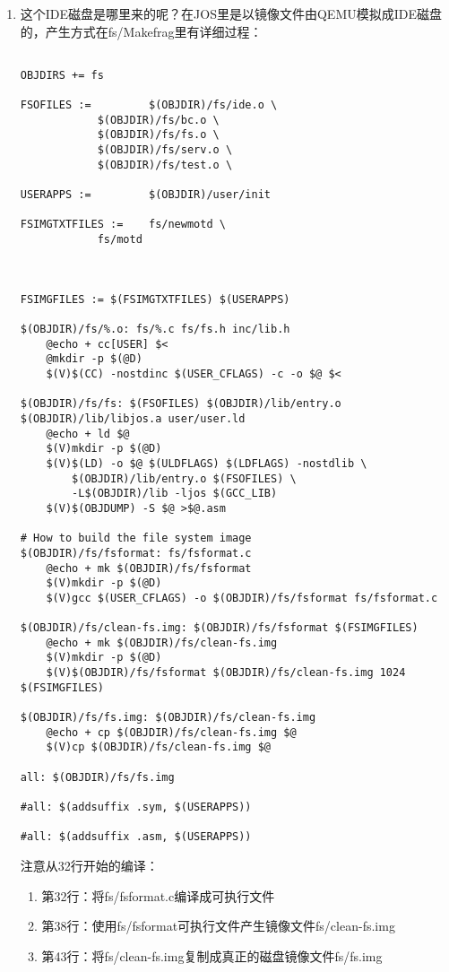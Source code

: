 \documentclass{article}
\begin{document}
\begin{CJK*}{UTF8}{gkai}
\begin{enumerate}
\item{这个IDE磁盘是哪里来的呢？在JOS里是以镜像文件由QEMU模拟成IDE磁盘的，产生方式在fs/Makefrag里有详细过程：

\begin{lstlisting}[style=mcode, title={\scriptsize \ttfamily \bfseries fs/Makefrag}]

OBJDIRS += fs

FSOFILES := 		$(OBJDIR)/fs/ide.o \
			$(OBJDIR)/fs/bc.o \
			$(OBJDIR)/fs/fs.o \
			$(OBJDIR)/fs/serv.o \
			$(OBJDIR)/fs/test.o \

USERAPPS := 		$(OBJDIR)/user/init

FSIMGTXTFILES :=	fs/newmotd \
			fs/motd



FSIMGFILES := $(FSIMGTXTFILES) $(USERAPPS)

$(OBJDIR)/fs/%.o: fs/%.c fs/fs.h inc/lib.h
	@echo + cc[USER] $<
	@mkdir -p $(@D)
	$(V)$(CC) -nostdinc $(USER_CFLAGS) -c -o $@ $<

$(OBJDIR)/fs/fs: $(FSOFILES) $(OBJDIR)/lib/entry.o $(OBJDIR)/lib/libjos.a user/user.ld
	@echo + ld $@
	$(V)mkdir -p $(@D)
	$(V)$(LD) -o $@ $(ULDFLAGS) $(LDFLAGS) -nostdlib \
		$(OBJDIR)/lib/entry.o $(FSOFILES) \
		-L$(OBJDIR)/lib -ljos $(GCC_LIB)
	$(V)$(OBJDUMP) -S $@ >$@.asm

# How to build the file system image
$(OBJDIR)/fs/fsformat: fs/fsformat.c
	@echo + mk $(OBJDIR)/fs/fsformat
	$(V)mkdir -p $(@D)
	$(V)gcc $(USER_CFLAGS) -o $(OBJDIR)/fs/fsformat fs/fsformat.c

$(OBJDIR)/fs/clean-fs.img: $(OBJDIR)/fs/fsformat $(FSIMGFILES)
	@echo + mk $(OBJDIR)/fs/clean-fs.img
	$(V)mkdir -p $(@D)
	$(V)$(OBJDIR)/fs/fsformat $(OBJDIR)/fs/clean-fs.img 1024 $(FSIMGFILES)

$(OBJDIR)/fs/fs.img: $(OBJDIR)/fs/clean-fs.img
	@echo + cp $(OBJDIR)/fs/clean-fs.img $@
	$(V)cp $(OBJDIR)/fs/clean-fs.img $@

all: $(OBJDIR)/fs/fs.img

#all: $(addsuffix .sym, $(USERAPPS))

#all: $(addsuffix .asm, $(USERAPPS))
\end{lstlisting}

注意从32行开始的编译：

\begin{enumerate}
\item{第32行：将fs/fsformat.c编译成可执行文件}
\item{第38行：使用fs/fsformat可执行文件产生镜像文件fs/clean-fs.img}
\item{第43行：将fs/clean-fs.img复制成真正的磁盘镜像文件fs/fs.img}
\end{enumerate}

}
\end{enumerate}
\end{CJK*}
\end{document}
